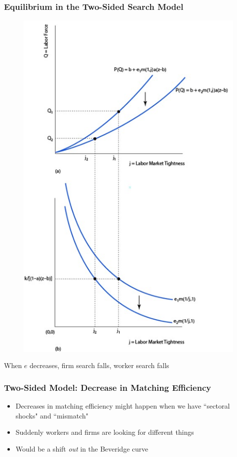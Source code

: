 \documentclass{beamer}
\begin{document}
\begin{frame}
\frametitle[alignment=center]{Equilibrium in the Two-Sided Search Model}
\begin{figure}
\centering
\includegraphics[scale=0.5]{Figures/W_Fig_6pt23.png}
\end{figure}
When $e$ decreases, firm search falls, worker search falls
\end{frame}

\begin{frame}
\frametitle[alignment=center]{Two-Sided Model:  Decrease in Matching Efficiency}
\begin{itemize}
\item Decreases in matching efficiency might happen when we have ``sectoral shocks" and ``mismatch"
\bigskip
\item Suddenly workers and firms are looking for different things
\bigskip
\item Would be a shift \emph{out} in the Beveridge curve
\end{itemize}
\end{frame}
\end{document}
